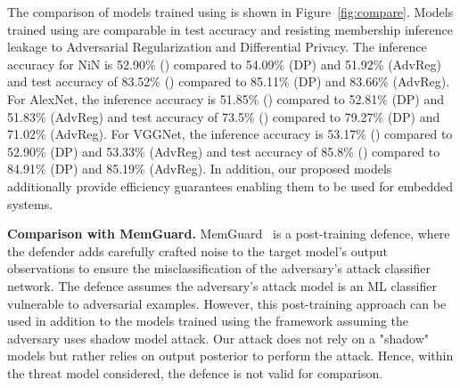 

The comparison of models trained using \method\hspace{0.02in} is shown in Figure~\ref{fig:compare}.
Models trained using \method\hspace{0.02in} are comparable in test accuracy and resisting membership inference leakage to Adversarial Regularization and Differential Privacy.
The inference accuracy for NiN is 52.90\% (\method) compared to 54.09\% (DP) and 51.92\% (AdvReg) and test accuracy of 83.52\% (\method) compared to 85.11\% (DP) and 83.66\% (AdvReg).
For AlexNet, the inference accuracy is 51.85\% (\method) compared to 52.81\% (DP) and 51.83\% (AdvReg) and test accuracy of 73.5\% (\method) compared to 79.27\% (DP) and 71.02\% (AdvReg).
For VGGNet, the inference accuracy is 53.17\% (\method) compared to 52.90\% (DP) and 53.33\% (AdvReg) and test accuracy of 85.8\% (\method) compared to 84.91\% (DP) and 85.19\% (AdvReg).
In addition, our proposed models additionally provide efficiency guarantees enabling them to be used for embedded systems.

\noindent\textbf{Comparison with MemGuard.} MemGuard~\cite{10.1145/3319535.3363201} is a post-training defence, where the defender adds carefully crafted noise to the target model's output observations to ensure the misclassification of the adversary's attack classifier network.
The defence assumes the adversary's attack model is an ML classifier vulnerable to adversarial examples.
However, this post-training approach can be used in addition to the models trained using the \method\hspace{0.02in} framework assuming the adversary uses shadow model attack.
Our attack does not rely on a "shadow" models but rather relies on output posterior to perform the attack.
Hence, within the threat model considered, the defence is not valid for comparison.
